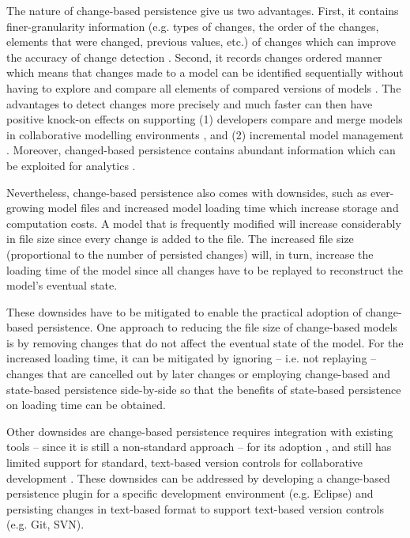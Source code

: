 The nature of change-based persistence give us two advantages. First, it contains finer-granularity information (e.g. types of changes, the order of the changes, elements that were changed, previous values, etc.) of changes which can improve the accuracy of change detection \cite{DBLP:journals/entcs/RobbesL07,DBLP:conf/sde/LippeO92,DBLP:conf/caise/IgnatN05,mens2002state}. Second, it records changes ordered manner which means that changes made to a model can be identified sequentially without having to explore and compare all elements of compared versions of models \cite{DBLP:conf/edoc/KoegelHLHD10}. The advantages to detect changes more precisely and much faster can then have positive knock-on effects on supporting (1) developers compare and merge models in collaborative modelling environments \cite{DBLP:conf/sde/LippeO92,DBLP:conf/caise/IgnatN05,koegel2010emfstore}, and (2) incremental model management \cite{jouault2010towards,DBLP:conf/ecmdafa/OgunyomiRK15, DBLP:conf/ecmdafa/RathHV12}. Moreover, changed-based persistence contains abundant information which can be exploited for analytics \cite{DBLP:journals/entcs/RobbesL07}.


Nevertheless, change-based persistence also comes with downsides, such as ever-growing model files 
\cite{DBLP:journals/entcs/RobbesL07,DBLP:conf/edoc/KoegelHLHD10} and increased model loading time \cite{mens2002state}
which increase storage and computation costs. A model that is frequently modified will increase considerably in file size 
since every change is added to the file. The increased file size (proportional to the number of persisted changes) will, 
in turn, increase the loading time of the model since all changes have to be replayed to reconstruct the model's 
eventual state. 

These downsides have to be mitigated to enable the practical adoption of change-based persistence. 
One approach to reducing the file size of change-based models is by removing changes that do not affect the eventual 
state of the model. For the increased loading time, it can be mitigated by ignoring -- i.e. not replaying -- changes 
that are cancelled out by later changes or employing change-based and state-based persistence side-by-side so that the
benefits of state-based persistence on loading time can be obtained. 

Other downsides are change-based persistence requires 
integration with existing tools -- since it is still a non-standard approach -- for its adoption \cite{koegel2010emfstore}, 
and still has limited support for standard, text-based version controls for collaborative development \cite{koegel2010emfstore}. 
These downsides can be addressed by developing a change-based persistence plugin for a specific development environment 
(e.g. Eclipse) and persisting changes in text-based format to support text-based version controls (e.g. Git, SVN).

